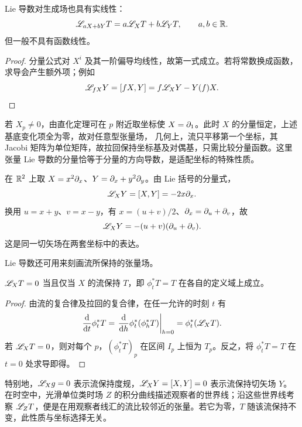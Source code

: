 \begin{corollary}
    Lie 导数对生成场也具有实线性：
    \[
        \mathscr{L}_{aX+bY}T=a\mathscr{L}_XT+b\mathscr{L}_YT,\qquad a,b\in\mathbb{R}.
    \]
    但一般不具有函数线性。
\end{corollary}
\begin{proof}
    分量公式对 $X^i$ 及其一阶偏导均线性，故第一式成立。若将常数换成函数，求导会产生额外项；例如
    \[
        \mathscr{L}_{fX}Y=[fX,Y]=f\mathscr{L}_XY-Y(f)X.
    \]
\end{proof}

\begin{example}[适配坐标]
    若 $X_p\ne0$，由直化定理可在 $p$ 附近取坐标使 $X=\partial_1$。此时 $X$ 的分量恒定，上述基底变化项全为零，故对任意型张量场，
    几何上，流只平移第一个坐标，其 Jacobi 矩阵为单位矩阵，故拉回保持坐标基及对偶基，只需比较分量函数。这里张量 Lie 导数的分量恰等于分量的方向导数，是适配坐标的特殊性质。
\end{example}

\begin{example}
    在 $\mathbb{R}^2$ 上取 $X=x^2\partial_x$、$Y=\partial_x+y^2\partial_y$。由 Lie 括号的分量式，
    \[
        \mathscr{L}_XY=[X,Y]=-2x\partial_x.
    \]
    换用 $u=x+y$、$v=x-y$，有 $x=(u+v)/2$、$\partial_x=\partial_u+\partial_v$，故
    \[
        \mathscr{L}_XY=-(u+v)(\partial_u+\partial_v).
    \]
    这是同一切矢场在两套坐标中的表达。
\end{example}

Lie 导数还可用来刻画流所保持的张量场。
\begin{theorem}
    $\mathscr{L}_XT=0$ 当且仅当 $X$ 的流保持 $T$，即 $\phi_t^*T=T$ 在各自的定义域上成立。
\end{theorem}
\begin{proof}
    由流的复合律及拉回的复合律，在任一允许的时刻 $t$ 有
    \[
        \frac{\dd}{\dd t}\phi_t^*T
        =\left.\frac{\dd}{\dd h}\phi_t^*(\phi_h^*T)\right|_{h=0}
        =\phi_t^*(\mathscr{L}_XT).
    \]
    若 $\mathscr{L}_XT=0$，则对每个 $p$，$(\phi_t^*T)_p$ 在区间 $I_p$ 上恒为 $T_p$。反之，将 $\phi_t^*T=T$ 在 $t=0$ 处求导即得。
\end{proof}

特别地，$\mathscr{L}_Xg=0$ 表示流保持度规，$\mathscr{L}_XY=[X,Y]=0$ 表示流保持切矢场 $Y$。在时空中，光滑单位类时场 $Z$ 的积分曲线描述观察者的世界线；沿这些世界线考察 $\mathscr{L}_ZT$，便是在用观察者线汇的流比较邻近的张量。若它为零，$T$ 随该流保持不变，此性质与坐标选择无关。